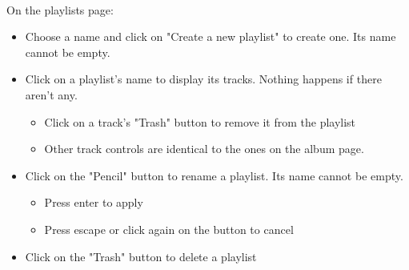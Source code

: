\documentclass[11pt]{article}
\begin{document}
        \noindent \\
        On the playlists page:
        \begin{itemize}
        \item Choose a name and click on "Create a new playlist" to create one. Its name cannot be empty.
        \item Click on a playlist's name to display its tracks. Nothing happens if there aren't any.
            \begin{itemize}
            \item Click on a track's "Trash" button to remove it from the playlist
            \item Other track controls are identical to the ones on the album page.
            \end{itemize}
        \item Click on the "Pencil" button to rename a playlist. Its name cannot be empty.
            \begin{itemize}
            \item Press enter to apply
            \item Press escape or click again on the button to cancel
            \end{itemize}
        \item Click on the "Trash" button to delete a playlist
        \end{itemize}
\end{document}
